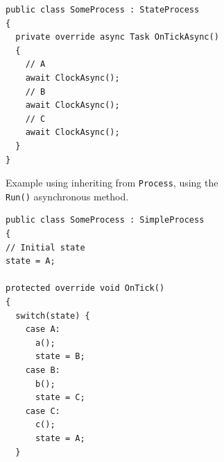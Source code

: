 \begin{figure}
    \begin{subfigure}[b]{0.3\textwidth}
        \centering
\begin{lstlisting}[language={[Sharp]C}]
public class SomeProcess : StateProcess
{
  private override async Task OnTickAsync()
  {
    // A
    await ClockAsync();
    // B
    await ClockAsync();
    // C
    await ClockAsync();
  }
}
\end{lstlisting}
        \caption{Example using inheriting from \texttt{Process}, using the \texttt{Run()} asynchronous method.}
	\label{fig:sme_example_process_async_code}
    \end{subfigure}
\hfill
    \begin{subfigure}[b]{0.3\textwidth}
\begin{lstlisting}[language={[Sharp]C}]
public class SomeProcess : SimpleProcess
{
// Initial state
state = A;

protected override void OnTick()
{
  switch(state) {
    case A:
      a();
      state = B;
    case B:
      b();
      state = C;
    case C:
      c();
      state = A;
  }


\end{lstlisting}
\end{subfigure}
\end{figure}

